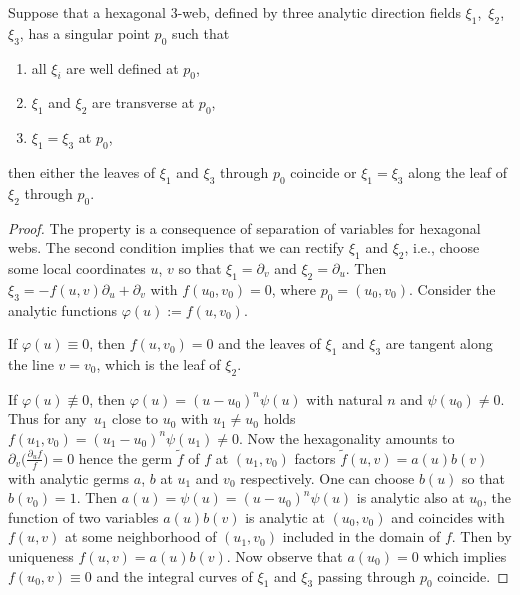 \begin{Lemma}\label{sing}
Suppose that a hexagonal $3$-web, defined by three analytic direction fields $\xi_1$,~$\xi_2$,~$\xi_3$, has a singular point $p_0$ such that
\begin{enumerate}\itemsep=0pt
\item[$(1)$] all $\xi_i$ are well defined at $p_0$,
\item[$(2)$] $\xi_1$ and $\xi_2$ are transverse at $p_0$,
\item[$(3)$] $\xi_1=\xi_3$ at $p_0$,
\end{enumerate}
then either the leaves of $\xi_1$ and $\xi_3$ through $p_0$ coincide or
$\xi_1=\xi_3$ along the leaf of $\xi_2$ through $p_0$.
\end{Lemma}
\begin{proof}
The property is a consequence of separation of variables for hexagonal webs.
The second condition implies that we can rectify $\xi_1$ and $\xi_2$, i.e., choose some local coordinates $u$, $v$ so that $\xi_1=\partial_v$ and $\xi_2=\partial_u$. Then $\xi_3=-f(u,v)\partial_u+\partial_v$ with $f(u_0,v_0)=0$, where $p_0=(u_0,v_0).$
Consider the analytic functions $\varphi(u):=f(u,v_0)$.

If $\varphi(u)\equiv 0$, then $f(u,v_0)=0$ and the leaves of $\xi_1$ and $\xi_3$ are tangent along the line $v=v_0$, which is the leaf of $\xi_2$.

 If $\varphi(u)\not\equiv 0$, then $\varphi(u)=(u-u_0)^n\psi(u)$ with natural $n$ and $\psi(u_0)\ne 0$. Thus for any~$u_1$ close to $u_0$ with $u_1\ne u_0$ holds $f(u_1,v_0)=(u_1-u_0)^n\psi(u_1)\ne 0$. Now the hexagonality amounts to~${\partial_v\bigl(\frac{\partial_uf}{f}\bigr)=0}$ hence the germ $\tilde{f}$ of $f$ at $(u_1,v_0)$ factors $\tilde{f}(u,v)=a(u)b(v)$ with analytic germs $a$, $b$ at $u_1$ and $v_0$ respectively. One can choose $b(u)$ so that $b(v_0)=1$. Then $a(u)=\psi(u)=(u-u_0)^n\psi(u)$ is analytic also at $u_0$, the function of two variables $a(u)b(v)$ is analytic at $(u_0,v_0)$ and coincides with $f(u,v)$ at some neighborhood of $(u_1,v_0)$ included in the domain of $f$. Then by uniqueness $f(u,v)=a(u)b(v)$. Now observe that $a(u_0)=0$ which
implies $f(u_0,v)\equiv 0$ and the integral curves of $\xi_1$ and $\xi_3$ passing through $p_0$ coincide.
\end{proof}

